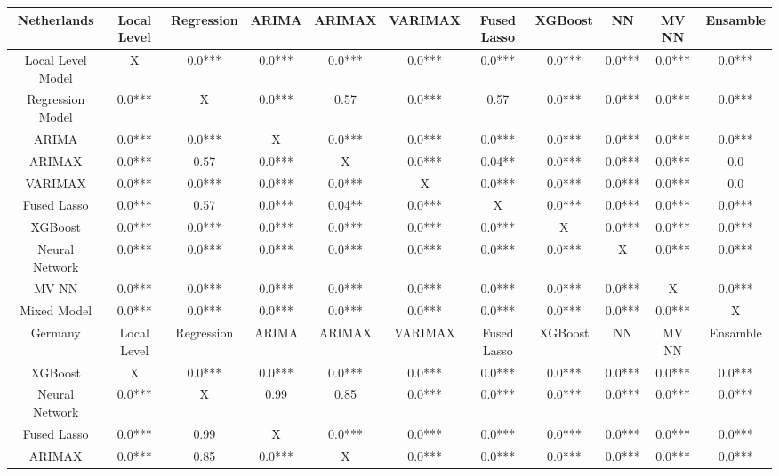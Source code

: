 \begin{landscape}
\pagestyle{empty}
\begin{table}[]
    \centering
    \begin{tabular}{|c|c c c c c c c c c c|}\hline
        Netherlands &  Local Level & Regression & ARIMA & ARIMAX & VARIMAX & Fused Lasso & XGBoost & NN & MV NN & Ensamble\\\hline
        Local Level Model & X & 0.0*** & 0.0*** & 0.0*** & 0.0*** & 0.0*** & 0.0*** & 0.0*** & 0.0*** & 0.0***\\
        Regression Model & 0.0*** & X & 0.0*** & 0.57 & 0.0*** & 0.57 & 0.0*** & 0.0*** & 0.0*** & 0.0***\\
        ARIMA & 0.0*** & 0.0*** & X & 0.0*** & 0.0*** & 0.0*** & 0.0*** & 0.0*** & 0.0*** & 0.0***\\
        ARIMAX & 0.0*** & 0.57 & 0.0*** & X & 0.0*** & 0.04** & 0.0*** & 0.0*** & 0.0*** & 0.0\\
        VARIMAX & 0.0*** & 0.0*** & 0.0*** & 0.0*** & X & 0.0*** & 0.0*** & 0.0*** & 0.0*** & 0.0\\
        Fused Lasso & 0.0*** & 0.57 & 0.0*** & 0.04** & 0.0*** & X & 0.0*** & 0.0*** & 0.0*** & 0.0***\\
        XGBoost & 0.0*** & 0.0*** & 0.0*** & 0.0*** & 0.0*** & 0.0*** & X & 0.0*** & 0.0*** & 0.0***\\
        Neural Network & 0.0*** & 0.0*** & 0.0*** & 0.0*** & 0.0*** & 0.0*** & 0.0*** & X & 0.0*** & 0.0***\\
        MV NN & 0.0*** & 0.0*** & 0.0*** & 0.0*** & 0.0*** & 0.0*** & 0.0*** & 0.0*** & X & 0.0***\\
        Mixed Model & 0.0*** & 0.0*** & 0.0*** & 0.0*** & 0.0*** & 0.0*** & 0.0*** & 0.0*** & 0.0*** & X\\\hline\hline
        Germany &  Local Level & Regression & ARIMA & ARIMAX & VARIMAX & Fused Lasso& XGBoost & NN & MV NN & Ensamble\\\hline
        XGBoost & X & 0.0*** & 0.0*** & 0.0*** & 0.0*** & 0.0*** & 0.0*** & 0.0*** & 0.0*** & 0.0***\\
        Neural Network & 0.0*** & X & 0.99 & 0.85 & 0.0*** & 0.0*** & 0.0*** & 0.0*** & 0.0*** & 0.0***\\
        Fused Lasso & 0.0*** & 0.99 & X & 0.0*** & 0.0*** & 0.0*** & 0.0*** & 0.0*** & 0.0*** & 0.0***\\
        ARIMAX & 0.0*** & 0.85 & 0.0*** & X & 0.0*** & 0.0*** & 0.0*** & 0.0*** & 0.0*** & 0.0***\\

\end{tabular}
\end{table}
\end{landscape}
